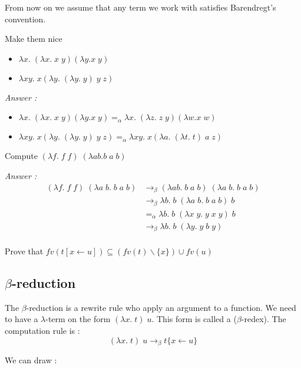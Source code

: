 \documentclass{article}
\theoremstyle{plain}
\theoremstyle{plain}
\begin{document}
  From now on we assume that any term we work with satisfies Barendregt’s
  convention.

  \exo Make them nice
    \begin{itemize}
      \item $\lambda x.\; (\lambda x.\; x\; y) (\lambda y. x\; y)$
      \item $\lambda x y.\; x (\lambda y.\; (\lambda y.\; y)\; y\; z)$
    \end{itemize}

  \textit{Answer :}
    \begin{itemize}
      \item $\lambda x.\; (\lambda x.\; x\; y) (\lambda y. x\; y) =_\alpha
        \lambda x.\; (\lambda z.\; z\; y) (\lambda w. x\; w)$
      \item $\lambda x y.\; x (\lambda y.\; (\lambda y.\; y)\; y\; z) =_\alpha
        \lambda x y.\; x (\lambda a.\; (\lambda t.\; t)\; a\; z)$
    \end{itemize}

  \exo Compute $(\lambda f.\; f\;f)\; (\lambda a b. b\;a\;b)$

  \textit{Answer :}
    \begin{align*}
      (\lambda f.\;f\;f)\; (\lambda a\; b.\;b\;a\;b) &\to_\beta
      (\lambda a b.\;b\;a\;b)\; (\lambda a\;b.\;b\;a\;b) \\
      &\to_\beta \lambda b.\;b\;(\lambda a\;b.\;b\;a\;b)\;b\\
      &=_\alpha \lambda b.\;b\;(\lambda x\;y.\;y\;x\;y)\;b\\
      &\to_\beta \lambda b.\;b\;(\lambda y.\;y\;b\;y)\\
    \end{align*}


  \exo Prove that $fv(t[x \leftarrow u]) \subseteq (fv(t) \backslash \{x\})
    \cup fv(u)$

  \subsection{$\beta$-reduction}

    The $\beta$-reduction is a rewrite rule who apply an argument to a function.
    We need to have a $\lambda$-term on the form $(\lambda x.\;t)\; u$. This
    form is called a ($\beta$-redex). The computation rule is :
    \[(\lambda x.\;t)\; u \to_\beta t\{x \leftarrow u\}\]

    We can draw :
\end{document}
